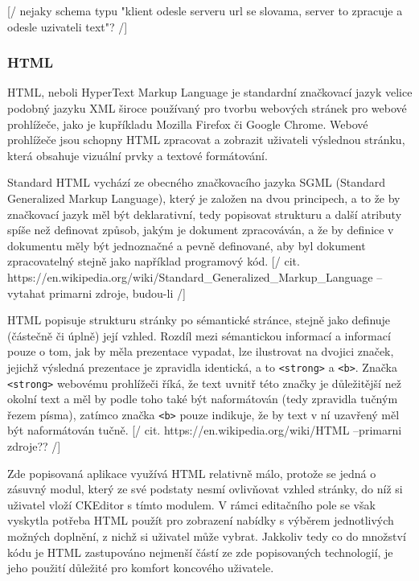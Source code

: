 \documentclass{article}
\begin{document}
[/ nejaky schema typu "klient odesle serveru url se slovama, server to zpracuje a odesle uzivateli text"? /]

\subsubsection{HTML}

HTML, neboli HyperText Markup Language je standardní značkovací jazyk velice podobný jazyku XML široce používaný pro tvorbu webových stránek pro webové prohlížeče, jako je kupříkladu Mozilla Firefox či Google Chrome. Webové prohlížeče jsou schopny HTML zpracovat a zobrazit uživateli výslednou stránku, která obsahuje vizuální prvky a textové formátování. 

Standard HTML vychází ze obecného značkovacího jazyka SGML (Standard Generalized Markup Language), který je založen na dvou principech, a to že by značkovací jazyk měl být deklarativní, tedy popisovat strukturu a další atributy spíše než definovat způsob, jakým je dokument zpracováván, a že by definice v dokumentu měly být jednoznačné a pevně definované, aby byl dokument zpracovatelný stejně jako například programový kód. [/ cit. https://en.wikipedia.org/wiki/Standard_Generalized_Markup_Language --vytahat primarni zdroje, budou-li /]

HTML popisuje strukturu stránky po sémantické stránce, stejně jako definuje (částečně či úplně) její vzhled. Rozdíl mezi sémantickou informací a informací pouze o tom, jak by měla prezentace vypadat, lze ilustrovat na dvojici značek, jejichž výsledná prezentace je zpravidla identická, a to {\tt <strong>} a {\tt <b>}. Značka {\tt <strong>} webovému prohlížeči říká, že text uvnitř této značky je důležitější než okolní text a měl by podle toho také být naformátován (tedy zpravidla tučným řezem písma), zatímco značka {\tt <b>} pouze indikuje, že by text v ní uzavřený měl být naformátován tučně. [/ cit. https://en.wikipedia.org/wiki/HTML --primarni zdroje?? /]

Zde popisovaná aplikace využívá HTML relativně málo, protože se jedná o zásuvný modul, který ze své podstaty nesmí ovlivňovat vzhled stránky, do níž si uživatel vloží CKEditor s tímto modulem. V rámci editačního pole se však vyskytla potřeba HTML použít pro zobrazení nabídky s výběrem jednotlivých možných doplnění, z nichž si uživatel může vybrat. Jakkoliv tedy co do množství kódu je HTML zastupováno nejmenší částí ze zde popisovaných technologií, je jeho použití důležité pro komfort koncového uživatele.
\end{document}
